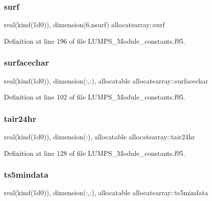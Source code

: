 \subsubsection{\texorpdfstring{surf}{surf}}
{\footnotesize\ttfamily real(kind(1d0)), dimension(6,nsurf) allocatearray\+::surf}



Definition at line 196 of file L\+U\+M\+P\+S\+\_\+\+Module\+\_\+constants.\+f95.

\mbox{\label{namespaceallocatearray_a2949f0a79f6170fceeef0c4b023e219d}} 
\subsubsection{\texorpdfstring{surfacechar}{surfacechar}}
{\footnotesize\ttfamily real(kind(1d0)), dimension(\+:,\+:), allocatable allocatearray\+::surfacechar}



Definition at line 102 of file L\+U\+M\+P\+S\+\_\+\+Module\+\_\+constants.\+f95.

\mbox{\label{namespaceallocatearray_a763b6159cb62d3d9bdba9505d8729007}} 
\subsubsection{\texorpdfstring{tair24hr}{tair24hr}}
{\footnotesize\ttfamily real(kind(1d0)), dimension(\+:), allocatable allocatearray\+::tair24hr}



Definition at line 128 of file L\+U\+M\+P\+S\+\_\+\+Module\+\_\+constants.\+f95.

\mbox{\label{namespaceallocatearray_a79aa4fab4188b3e6b7a24b64220153e2}} 
\subsubsection{\texorpdfstring{ts5mindata}{ts5mindata}}
{\footnotesize\ttfamily real(kind(1d0)), dimension(\+:,\+:), allocatable allocatearray\+::ts5mindata}



